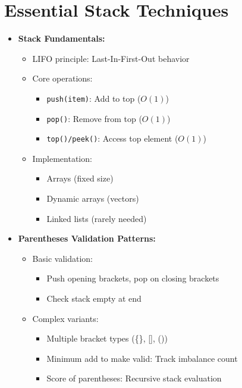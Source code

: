 \documentclass[a4paper,10pt]{book}
\begin{document}
\chapter{Essential Stack Techniques }
\label{sec:stack}
\begin{itemize}
    \item \textbf{Stack Fundamentals:}
    \begin{itemize}
        \item LIFO principle: Last-In-First-Out behavior
        \item Core operations:
        \begin{itemize}
            \item \texttt{push(item)}: Add to top ($O(1)$)
            \item \texttt{pop()}: Remove from top ($O(1)$)
            \item \texttt{top()/peek()}: Access top element ($O(1)$)
        \end{itemize}
        \item Implementation: 
        \begin{itemize}
            \item Arrays (fixed size)
            \item Dynamic arrays (vectors)
            \item Linked lists (rarely needed)
        \end{itemize}
    \end{itemize}
    
    \item \textbf{Parentheses Validation Patterns:}
    \begin{itemize}
        \item Basic validation:
        \begin{itemize}
            \item Push opening brackets, pop on closing brackets
            \item Check stack empty at end
        \end{itemize}
        \item Complex variants:
        \begin{itemize}
            \item Multiple bracket types (\{\}, [], ())
            \item Minimum add to make valid: Track imbalance count
            \item Score of parentheses: Recursive stack evaluation
        \end{itemize}
    \end{itemize}
    

\end{itemize}
\end{document}
